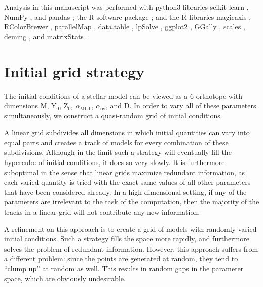 \documentclass[manuscript]{aastex}
\begin{document}
Analysis in this manuscript was performed with python3 libraries scikit-learn \citep{scikit-learn}, NumPy \citep{van2011numpy}, and pandas \citep{mckinney2010data}; the R software package \citep{R}; and the R libraries magicaxis \citep{magicaxis}, RColorBrewer \citep{RColorBrewer}, parallelMap \citep{parallelMap}, data.table \citep{data.table}, lpSolve \citep{lpSolve}, ggplot2 \citep{ggplot2}, GGally \citep{GGally}, scales \citep{scales}, deming \citep{deming}, and matrixStats \citep{matrixStats}. 

\appendix


\section{Initial grid strategy}
\label{sec:grid}
The initial conditions of a stellar model can be viewed as a 6-orthotope with dimensions M, Y$_0$, Z$_0$, $\alpha_{\text{MLT}}$, $\alpha_{\text{ov}}$, and D. In order to vary all of these parameters simultaneously, we construct a quasi-random grid of initial conditions. 

A linear grid subdivides all dimensions in which initial quantities can vary into equal parts and creates a track of models for every combination of these subdivisions. Although in the limit such a strategy will eventually fill the hypercube of initial conditions, it does so very slowly. It is furthermore suboptimal in the sense that linear grids maximize redundant information, as each varied quantity is tried with the exact same values of all other parameters that have been considered already. In a high-dimensional setting, if any of the parameters are irrelevant to the task of the computation, then the majority of the tracks in a linear grid will not contribute any new information.

A refinement on this approach is to create a grid of models with randomly varied initial conditions. Such a strategy fills the space more rapidly, and furthermore solves the problem of redundant information. However, this approach suffers from a different problem: since the points are generated at random, they tend to ``clump up'' at random as well. This results in random gaps in the parameter space, which are obviously undesirable. 
\end{document}
